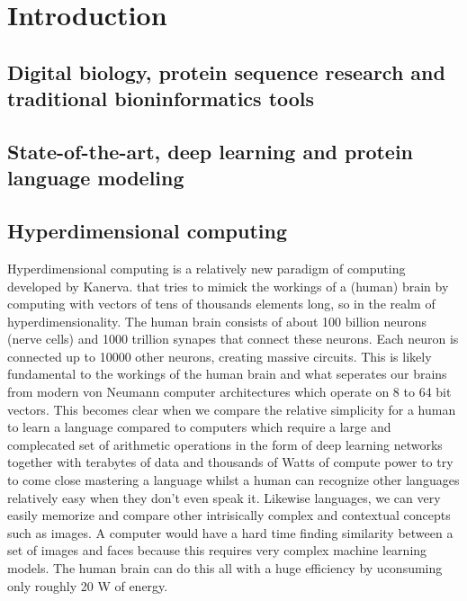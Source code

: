 \chapter[Introduction]%
{Introduction}

\section*{Digital biology, protein sequence research and traditional bioninformatics tools}

\section*{State-of-the-art, deep learning and protein language modeling}

\section*{Hyperdimensional computing}
Hyperdimensional computing is a relatively new paradigm of computing developed by Kanerva. \cite{Kanerva2009} that tries to mimick the workings of a (human) brain by computing with vectors of tens of thousands elements long, so in the realm of hyperdimensionality. The human brain consists of about 100 billion neurons (nerve cells) and 1000 trillion synapes that connect these neurons. Each neuron is connected up to 10000 other neurons, creating massive circuits. This is likely fundamental to the workings of the human brain and what seperates our brains from modern  von Neumann computer architectures which operate on 8 to 64 bit vectors. This becomes clear when we compare the relative simplicity for a human to learn a language compared to computers which require a large and complecated set of arithmetic operations in the form of deep learning networks together with terabytes of data and thousands of Watts of compute power to try to come close mastering a language whilst a human can recognize other languages relatively easy when they don't even speak it. Likewise languages, we can very easily memorize and compare other intrisically complex and contextual concepts such as images. A computer would have a hard time finding similarity between a set of images and faces because this requires very complex machine learning models. The human brain can do this all with a huge efficiency by uconsuming only roughly 20 W of energy.

